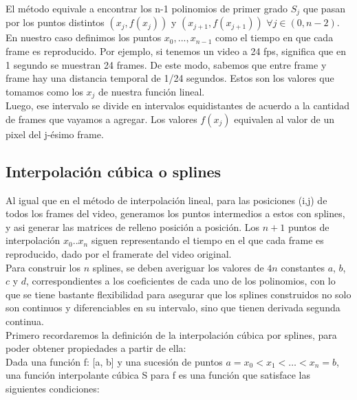 El método equivale a encontrar los n-1 polinomios de primer grado $S_{j}$ que pasan por los puntos distintos $(x_{j},f(x_{j}))$ y $(x_{j+1},f(x_{j+1}))$ $\forall j \in (0,n-2)$.\\
En nuestro caso definimos los puntos $x_{0}, ... , x_{n-1}$ como el tiempo en que cada frame es reproducido. Por ejemplo, si tenemos un video a 24 fps, significa que en 1 segundo se muestran 24 frames. De este modo, sabemos que entre frame y frame hay una distancia temporal de 1/24 segundos. Estos son los valores que tomamos como los $x_{j}$ de nuestra función lineal. \\
Luego, ese intervalo se divide en intervalos equidistantes de acuerdo a la cantidad de frames que vayamos a agregar. Los valores $f(x_{j})$ equivalen al valor de un pixel del j-ésimo frame. 




\subsection{Interpolación cúbica o splines}

Al igual que en el método de interpolación lineal, para las posiciones (i,j) de todos los frames del video, generamos los puntos intermedios a estos con splines, y asi generar las matrices de relleno posición a posición. Los $n+1$ puntos de interpolación $x_{0} .. x_{n}$ siguen representando el tiempo en el que cada frame es reproducido, dado por el framerate del video original.\\

Para construir los $n$ splines, se deben averiguar los valores de $4n$ constantes $a$, $b$, $c$ y $d$, correspondientes a los coeficientes de cada uno de los polinomios, con lo que se tiene bastante flexibilidad para asegurar que los splines construidos no solo son continuos y diferenciables en su intervalo, sino que tienen derivada segunda continua.\\
Primero recordaremos la definición de la interpolación cúbica por splines, para poder obtener propiedades a partir de ella: \\
Dada una función f: [a, b] y una sucesión de puntos $a= x_{0} < x_{1} < … < x_{n} = b$, una función interpolante cúbica S para f es una función que satisface las siguientes condiciones: \\

